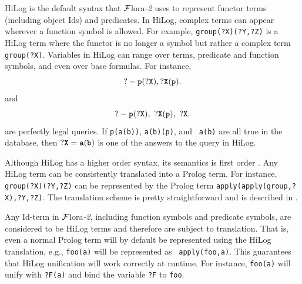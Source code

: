 \documentclass[11pt]{article}
\newcommand{\FLORA}{{\mbox{\sc ${\cal F}${lora}\rm\emph{-2}}}\xspace}
\newcommand{\FLSYSTEM}{\FLORA}
\begin{document}
%
HiLog \cite{hilog-jlp} is the default syntax that \FLSYSTEM uses to
represent functor terms (including object Ids) and predicates.  In
HiLog, complex terms can appear wherever a function symbol is
allowed. For example, {\tt group(?X)(?Y,?Z)} is a HiLog term where the
functor is no longer a symbol but rather a complex term {\tt
group(?X)}. Variables in HiLog can range over terms, predicate and
function symbols, and even over base formulas. For instance,
\[
{\tt
 ?- p(?X), ?X(p).
}
\]
\noindent
and
\begin{equation}\label{eq-hilog-notallowed}
{\tt
 ?- p(?X), ~?X(p), ~?X.  
}
\end{equation}
\noindent
are perfectly legal queries. If {\tt p(a(b))}, {\tt a(b)(p)}, and {\tt
a(b)} are all true in the database, then $\tt ?X=a(b)$ is one of the answers
to the query in HiLog.


%
Although HiLog has a higher order syntax, its semantics is first order
\cite{hilog-jlp}. Any HiLog term can be consistently translated into a
Prolog term. For instance, {\tt group(?X)(?Y,?Z)} can be represented by the
Prolog term {\tt apply(apply(group,?X),?Y,?Z)}. The translation scheme is
pretty straightforward and is described in \cite{hilog-jlp}.

Any Id-term in \FLSYSTEM, including function symbols and predicate symbols,
are considered to be HiLog terms and therefore are subject to translation.
That is, even a normal Prolog term will by default be represented using the
HiLog translation, e.g., {\tt foo(a)} will be represented as {\tt
  apply(foo,a)}. This guarantees that HiLog unification will work correctly
at runtime. For instance, {\tt foo(a)} will unify with {\tt ?F(a)} and bind
the variable {\tt ?F} to {\tt foo}.
\end{document}
